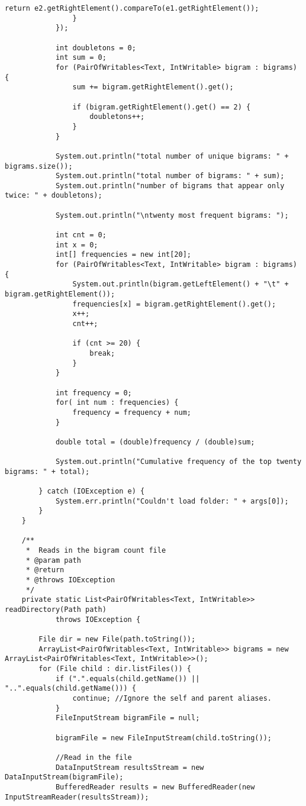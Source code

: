 \documentclass{article} %
\begin{document}
\begin{lstlisting}[style=Java]
					return e2.getRightElement().compareTo(e1.getRightElement());
				}
			});

			int doubletons = 0;
			int sum = 0;
			for (PairOfWritables<Text, IntWritable> bigram : bigrams) {
				sum += bigram.getRightElement().get();

				if (bigram.getRightElement().get() == 2) {
					doubletons++;
				}
			}

			System.out.println("total number of unique bigrams: " + bigrams.size());
			System.out.println("total number of bigrams: " + sum);
			System.out.println("number of bigrams that appear only twice: " + doubletons);

			System.out.println("\ntwenty most frequent bigrams: ");

			int cnt = 0;
			int x = 0;
			int[] frequencies = new int[20];
			for (PairOfWritables<Text, IntWritable> bigram : bigrams) {
				System.out.println(bigram.getLeftElement() + "\t" + bigram.getRightElement());
				frequencies[x] = bigram.getRightElement().get();
				x++;
				cnt++;

				if (cnt >= 20) {
					break;
				}
			}
			
			int frequency = 0;
			for( int num : frequencies) {
				frequency = frequency + num;
			}
			
			double total = (double)frequency / (double)sum; 

			System.out.println("Cumulative frequency of the top twenty bigrams: " + total);
			
		} catch (IOException e) {
			System.err.println("Couldn't load folder: " + args[0]);
		}
	}

	/**
	 *  Reads in the bigram count file 
	 * @param path
	 * @return
	 * @throws IOException
	 */
	private static List<PairOfWritables<Text, IntWritable>> readDirectory(Path path)
			throws IOException {

		File dir = new File(path.toString());
		ArrayList<PairOfWritables<Text, IntWritable>> bigrams = new ArrayList<PairOfWritables<Text, IntWritable>>();
		for (File child : dir.listFiles()) {
			if (".".equals(child.getName()) || "..".equals(child.getName())) {
				continue; //Ignore the self and parent aliases.
			}
			FileInputStream bigramFile = null;

			bigramFile = new FileInputStream(child.toString());

			//Read in the file
			DataInputStream resultsStream = new DataInputStream(bigramFile);
			BufferedReader results = new BufferedReader(new InputStreamReader(resultsStream));


\end{lstlisting}
\end{document}

